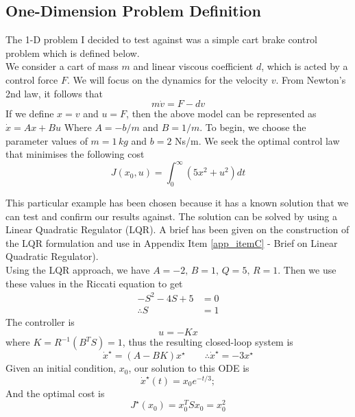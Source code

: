 \documentclass[11pt,draftd]{article}
\begin{document}
\subsection{One-Dimension Problem Definition} \label{1dproblemdefinition}
The 1-D problem I decided to test against was a simple cart brake control problem which is defined below. \\

We consider a cart of mass $ m $ and linear viscous coefficient $ d $, which is acted by a control force $ F $. We will focus on the dynamics for the velocity $ v $. From Newton's 2nd law, it follows that
\begin{equation*}
	m\dot{v}=F-dv
\end{equation*}
If we define $ x = v $ and $ u = F $, then the above model can be represented as
$ \dot{x} = Ax + Bu$
Where $ A = -b/m $ and $ B = 1/m $. To begin, we choose the parameter values of $ m = 1\,kg$ and $ b = 2 $ Ns/m. We seek the optimal control law that minimises the following cost
\begin{equation*}
	J(x_0, u) = \int_{0}^{\infty}(5x^{2} + u^{2}) dt
\end{equation*}

This particular example has been chosen because it has a known solution that we can test and confirm our results against. The solution can be solved by using a Linear Quadratic Regulator (LQR). A brief has been given on the construction of the LQR formulation and use in Appendix Item \ref{app_itemC} - Brief on Linear Quadratic Regulator). \\

Using the LQR approach, we have $ A = -2,\, B = 1,\, Q = 5,\, R = 1 $. Then we use these values in the Riccati equation to get
\begin{align*}
	-S^{2}-4S + 5 &= 0 \\
	\therefore S &= 1
\end{align*}
The controller is 
\begin{equation*}
	u = -Kx
\end{equation*}
where $ K = R^{-1}(B^{T}S) = 1 $, thus the resulting closed-loop system is
\begin{equation*}
	\dot{x}^{\star} = (A - BK) x^{\star}  \qquad \therefore \dot{x}^{\star} = -3x^{\star}
\end{equation*}
Given an initial condition, $ x_0 $, our solution to this ODE is
\begin{equation*}\label{key}
	\dot{x}^{\star}(t) = x_{0}e^{-t/3};
\end{equation*}
And the optimal cost is 
\begin{equation*}
	J^{\star}(x_0) = x_{0}^{T}Sx_{0}=x_{0}^{2}
\end{equation*}
\[\]
\end{document}
